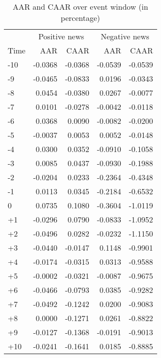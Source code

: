 \begin{table}[ht]
\centering
\begin{tabular}{lrrrr}
  \hline
   & \multicolumn{2}{c}{Positive news} & \multicolumn{2}{c}{Negative news}  \\
  Time & AAR & CAAR & AAR & CAAR \\
 \hline
-10 & -0.0368 & -0.0368 & -0.0539 & -0.0539 \\ 
  -9 & -0.0465 & -0.0833 & 0.0196 & -0.0343 \\ 
  -8 & 0.0454 & -0.0380 & 0.0267 & -0.0077 \\ 
  -7 & 0.0101 & -0.0278 & -0.0042 & -0.0118 \\ 
  -6 & 0.0368 & 0.0090 & -0.0082 & -0.0200 \\ 
  -5 & -0.0037 & 0.0053 & 0.0052 & -0.0148 \\ 
  -4 & 0.0300 & 0.0352 & -0.0910 & -0.1058 \\ 
  -3 & 0.0085 & 0.0437 & -0.0930 & -0.1988 \\ 
  -2 & -0.0204 & 0.0233 & -0.2364 & -0.4348 \\ 
  -1 & 0.0113 & 0.0345 & -0.2184 & -0.6532 \\ 
  0 & 0.0735 & 0.1080 & -0.3604 & -1.0119 \\ 
  +1 & -0.0296 & 0.0790 & -0.0833 & -1.0952 \\ 
  +2 & -0.0496 & 0.0282 & -0.0232 & -1.1150 \\ 
  +3 & -0.0440 & -0.0147 & 0.1148 & -0.9901 \\ 
  +4 & -0.0174 & -0.0315 & 0.0313 & -0.9588 \\ 
  +5 & -0.0002 & -0.0321 & -0.0087 & -0.9675 \\ 
  +6 & -0.0466 & -0.0793 & 0.0385 & -0.9282 \\ 
  +7 & -0.0492 & -0.1242 & 0.0200 & -0.9083 \\ 
  +8 & 0.0000 & -0.1271 & 0.0261 & -0.8822 \\ 
  +9 & -0.0127 & -0.1368 & -0.0191 & -0.9013 \\ 
  +10 & -0.0241 & -0.1641 & 0.0185 & -0.8885 \\ 
   \hline
\end{tabular}
\caption{AAR and CAAR over event window (in percentage)} 
\end{table}


